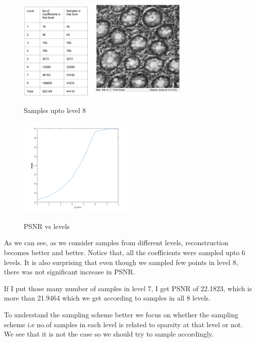 \documentclass{article}
\begin{document}
\begin{figure}[ht]
 \centering  
 \includegraphics[width=0.75\textwidth]{Figures/upto_level8.png}
 \label{fig:1}
 \caption{Samples upto level 8}
\end{figure}


\begin{figure}[ht]
 \centering  
 \includegraphics[width=0.5\textwidth]{Figures/psnr_sampling.png}
 \label{fig:1}
 \caption{PSNR vs levels}
\end{figure}

As we can see, as we consider samples from different levels, reconstruction becomes better and better. Notice that, all the coefficients were sampled upto 6 levels. It is also surprising that even though we sampled few points in level 8, there was not significant increase in PSNR.

If I put those many number of samples in level 7, I get PSNR of 22.1823, which is more than 21.9464 which we get according to samples in all 8 levels.

To understand the sampling scheme better we focus on whether the sampling scheme i.e no.of samples in each level is related to sparsity at that level or not. We see that it is not the case so we should try to sample accordingly.
\end{document}
